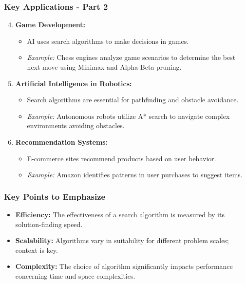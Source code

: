 \documentclass[aspectratio=169]{beamer}
\begin{document}
\begin{frame}[fragile]
    \frametitle{Key Applications - Part 2}
    \begin{enumerate}
        \setcounter{enumi}{3} %
        \item \textbf{Game Development:}
        \begin{itemize}
            \item AI uses search algorithms to make decisions in games.
            \item \textit{Example:} Chess engines analyze game scenarios to determine the best next move using Minimax and Alpha-Beta pruning.
        \end{itemize}

        \item \textbf{Artificial Intelligence in Robotics:}
        \begin{itemize}
            \item Search algorithms are essential for pathfinding and obstacle avoidance.
            \item \textit{Example:} Autonomous robots utilize A* search to navigate complex environments avoiding obstacles.
        \end{itemize}

        \item \textbf{Recommendation Systems:}
        \begin{itemize}
            \item E-commerce sites recommend products based on user behavior.
            \item \textit{Example:} Amazon identifies patterns in user purchases to suggest items.
        \end{itemize}
    \end{enumerate}
\end{frame}

\begin{frame}[fragile]
    \frametitle{Key Points to Emphasize}
    \begin{itemize}
        \item \textbf{Efficiency:} The effectiveness of a search algorithm is measured by its solution-finding speed.
        \item \textbf{Scalability:} Algorithms vary in suitability for different problem scales; context is key.
        \item \textbf{Complexity:} The choice of algorithm significantly impacts performance concerning time and space complexities.
    \end{itemize}
\end{frame}
\end{document}
